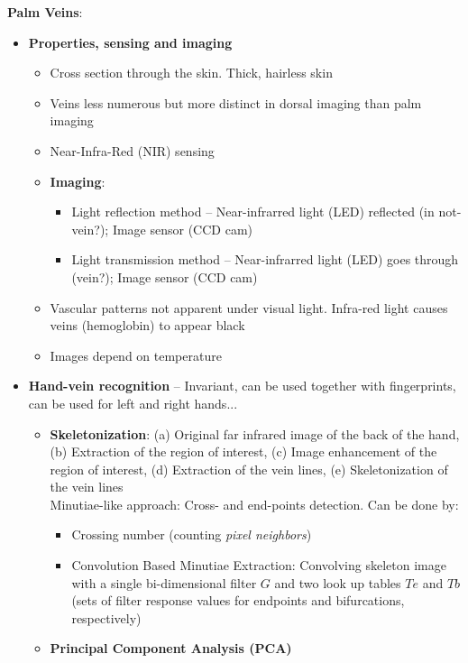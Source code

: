 \documentclass[a4paper]{article}
\begin{document}
      \textbf{Palm Veins}:
      \begin{itemize}
        \item \textbf{Properties, sensing and imaging}
        \begin{itemize}
          \item Cross section through the skin. Thick, hairless skin
          \item Veins less numerous but more distinct in dorsal imaging than palm imaging
          \item Near-Infra-Red (NIR) sensing
          \item \textbf{Imaging}:
          \begin{itemize}
            \item Light reflection method -- Near-infrarred light (LED) reflected (in not-vein?); Image sensor (CCD cam)
            \item Light transmission method -- Near-infrarred light (LED) goes through (vein?); Image sensor (CCD cam)
          \end{itemize}
          \item Vascular patterns not apparent under visual light. Infra-red light causes veins (hemoglobin) to appear black
          \item Images depend on temperature
        \end{itemize}
        \item \textbf{Hand-vein recognition} -- Invariant, can be used together with fingerprints, can be used for left and right hands...
        \begin{itemize}
          \item \textbf{Skeletonization}: (a) Original far infrared image of the back of the hand, (b) Extraction of the region of interest, (c) Image enhancement of the region of interest, (d) Extraction of the vein lines, (e) Skeletonization of the vein lines\\ Minutiae-like approach: Cross- and end-points detection. Can be done by:
          \begin{itemize}
            \item Crossing number (counting \emph{pixel neighbors})
            \item Convolution Based Minutiae Extraction: Convolving skeleton image with a single bi-dimensional filter $G$ and two look up tables $Te$ and $Tb$ (sets of filter response values for endpoints and bifurcations, respectively)
          \end{itemize}
          \item \textbf{Principal Component Analysis (PCA)}

\end{itemize}
\end{itemize}
\end{document}
